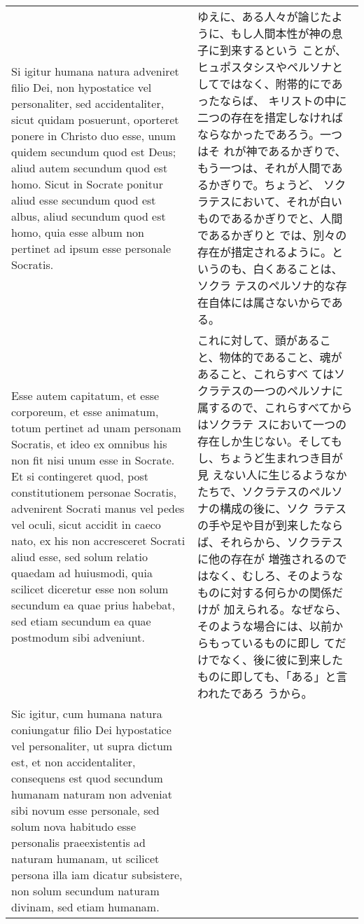 \documentclass[10pt]{jsarticle} %
\begin{document}
\begin{longtable}{p{21em}p{21em}}
Si igitur humana natura adveniret filio Dei, non hypostatice vel
personaliter, sed accidentaliter, sicut quidam posuerunt, oporteret
ponere in Christo duo esse, unum quidem secundum quod est Deus; aliud
autem secundum quod est homo. Sicut in Socrate ponitur aliud esse
secundum quod est albus, aliud secundum quod est homo, quia esse album
non pertinet ad ipsum esse personale Socratis.


&

ゆえに、ある人々が論じたように、もし人間本性が神の息子に到来するという
ことが、ヒュポスタシスやペルソナとしてではなく、附帯的にであったならば、
キリストの中に二つの存在を措定しなければならなかったであろう。一つはそ
れが神であるかぎりで、もう一つは、それが人間であるかぎりで。ちょうど、
ソクラテスにおいて、それが白いものであるかぎりでと、人間であるかぎりと
では、別々の存在が措定されるように。というのも、白くあることは、ソクラ
テスのペルソナ的な存在自体には属さないからである。



\\


Esse autem capitatum, et esse corporeum, et esse animatum, totum
pertinet ad unam personam Socratis, et ideo ex omnibus his non fit
nisi unum esse in Socrate. Et si contingeret quod, post constitutionem
personae Socratis, advenirent Socrati manus vel pedes vel oculi, sicut
accidit in caeco nato, ex his non accresceret Socrati aliud esse, sed
solum relatio quaedam ad huiusmodi, quia scilicet diceretur esse non
solum secundum ea quae prius habebat, sed etiam secundum ea quae
postmodum sibi adveniunt.


&

これに対して、頭があること、物体的であること、魂があること、これらすべ
てはソクラテスの一つのペルソナに属するので、これらすべてからはソクラテ
スにおいて一つの存在しか生じない。そしてもし、ちょうど生まれつき目が見
えない人に生じるようなかたちで、ソクラテスのペルソナの構成の後に、ソク
ラテスの手や足や目が到来したならば、それらから、ソクラテスに他の存在が
増強されるのではなく、むしろ、そのようなものに対する何らかの関係だけが
加えられる。なぜなら、そのような場合には、以前からもっているものに即し
てだけでなく、後に彼に到来したものに即しても、「ある」と言われたであろ
うから。

\\


Sic igitur, cum humana natura coniungatur filio Dei hypostatice vel
personaliter, ut supra dictum est, et non accidentaliter, consequens
est quod secundum humanam naturam non adveniat sibi novum esse
personale, sed solum nova habitudo esse personalis praeexistentis ad
naturam humanam, ut scilicet persona illa iam dicatur subsistere, non
solum secundum naturam divinam, sed etiam humanam.



\end{longtable}
\end{document}
